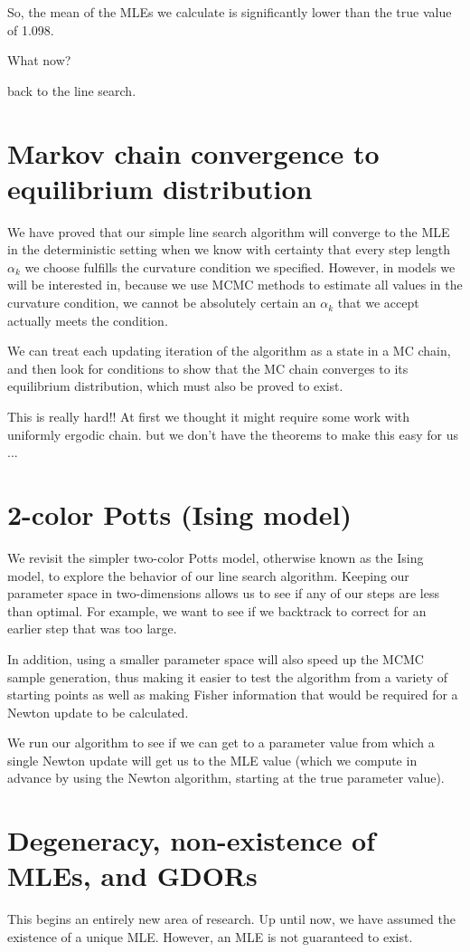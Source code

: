 \documentclass{amsbook}
\theoremstyle{definition}
\theoremstyle{remark}
\begin{document}
So, the mean of the MLEs we calculate is significantly lower than the true value of 
1.098.

What now?

back to the line search.

\section{Markov chain convergence to equilibrium distribution}
We have proved that our simple line search algorithm will converge to the MLE in the 
deterministic setting when we know with certainty that every step length $\alpha_k$ 
we choose fulfills the curvature condition we specified.  However, in models we will 
be interested in, because we use MCMC methods to estimate all values in the curvature 
condition, we cannot be absolutely certain an $\alpha_k$ that we accept actually 
meets the condition.  

We can treat each updating iteration of the algorithm as a state in a MC chain, and 
then look for conditions to show that the MC chain converges to its equilibrium 
distribution, which must also be proved to exist.

This is really hard!!  At first we thought it might require some work with uniformly 
ergodic chain.  but we don't have the theorems to make this easy for us ...

\section{2-color Potts (Ising model)}  
We revisit the simpler two-color Potts model, otherwise known as the Ising model, to 
explore the behavior of our line search algorithm.  Keeping our parameter space in 
two-dimensions allows us to see if any of our steps are less than optimal.  For 
example, we want to see if we backtrack to correct for an earlier step that was too 
large.  

In addition, using a smaller parameter space will also speed up the MCMC sample 
generation, thus making it easier to test the algorithm from a variety of starting 
points as well as making Fisher information that would be required for a Newton 
update to be calculated.

We run our algorithm to see if we can get to a parameter value from which a single 
Newton update will get us to the MLE value (which we compute in advance by using the 
Newton algorithm, starting at the true parameter value).

\newpage
\section{Degeneracy, non-existence of MLEs, and GDORs}
This begins an entirely new area of research.  Up until now, we have assumed the 
existence of a unique MLE.  However, an MLE is not guaranteed to exist.
\end{document}
